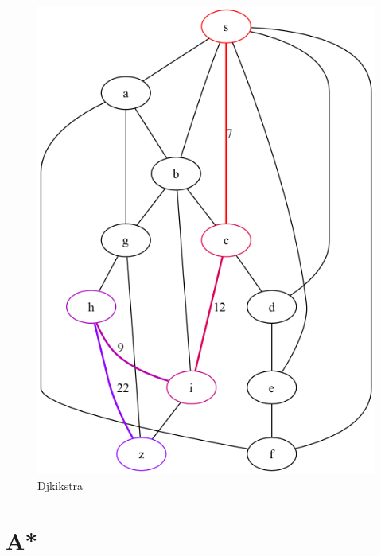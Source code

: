 \documentclass[a4paper,11pt]{report}
\begin{document}
    \begin{figure}[htbp]
        \centering
        \includegraphics[height=0.33\textheight]{notebooks/assets/aufgabe_05/djikstra.png}
        \caption{Djkikstra}
        \label{fig:djkistra_graph}
    \end{figure}
    \newpage

    \section{A*}\label{sec:astar}
\end{document}

